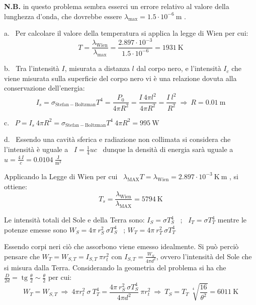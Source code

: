 \documentclass[12pt,twoside,a4]{article}
\DeclareMathOperator{\tg}{tg}
\begin{document}
\begin{solution}
	\textbf{N.B.} in questo problema sembra esserci un errore relativo al valore della lunghezza d'onda, che dovrebbe essere $\lambda_{\mathrm{max}} = 1.5 \cdot 10^{-6} \ \mathrm{m}$ .

\medskip
a. \ Per calcolare il valore della temperatura si applica la legge di Wien per cui: \begin{equation*}
 T = \frac{\lambda_{\mathrm{Wien}}}{\lambda_{\mathrm{max}}} = \frac{2.897 \cdot 10^{-3}}{1.5 \cdot 10^{-6}} = 1931 \ \mathrm{K}  
\end{equation*}

\bigskip
b. \ Tra l'intensità $I$, misurata a distanza $l$ dal corpo nero,  e l'intensità $I_c$ che viene misurata sulla superficie del corpo nero vi è una relazione dovuta alla conservazione dell'energia:  \begin{equation*}
 I_s = \sigma_{\mathrm{Stefan-Boltzman} } T^4 = \frac{P_0}{ 4\pi R^2} = \frac{I \ 4\pi l^2}{4 \pi R^2} = \frac{I \ l^2}{R^2}  \  \Rightarrow  \  R = 0.01 \ \mathrm{m}  
\end{equation*}

\bigskip
c. \ $P = I_s \ 4\pi R^2 = \sigma_{\mathrm{Stefan-Boltzman} } T^4 \ 4\pi R^2 = 995 \ \mathrm{W}$

\bigskip
d. \ Essendo una cavità sferica e radiazione non collimata si considera che l'intensità è uguale a \ $I = \frac{1}{4} u c $ \ dunque la densità di energia sarà uguale a \ $u = \frac{4 \ I}{c} = 0.0104 \ \frac{\mathrm{J}}{\mathrm{m}^2} $ 
\end{solution}

\newpage
\begin{solution}
	Applicando la Legge di Wien per cui  \ $\lambda_\mathrm{MAX}  T = \lambda_{\mathrm{Wien}} = 2.897 \cdot 10^{-3} \ {\mathrm{K \ m}}$ ,  si ottiene: 
 \begin{equation*}
     T_s = \frac{\lambda_{\mathrm{Wien}}}{\lambda_{\mathrm{MAX}}} = 5794 \ \mathrm{K} 
 \end{equation*}
\end{solution}


\begin{solution}
	Le intensità totali del Sole e della Terra sono: $I_S = \sigma  T^4_S$ \ ; \ $I_T = \sigma  T^4_T$ 
  mentre le potenze emesse sono $W_S = 4\pi \ r^2_S \ \sigma T^4_S$ \ ;  $W_T = 4\pi \ r^2_T \ \sigma T^4_T$ 
 
 \medskip
 Essendo corpi neri ciò che assorbono viene emesso idealmente. Si può perciò pensare che ${W}_T = {W}_{S,T} = I_{S,T} \ \pi r^2_t$ con $I_{S,T} = \frac{W_S}{4\pi d^2}$, ovvero l'intensità del Sole che si misura dalla Terra. 
 Considerando la geometria del problema si ha che $\frac{D}{2d} = \tg{\frac{\theta}{2}} \sim \frac{\theta}{2}$ per cui: 
 \begin{equation*}
     W_T = W_{S,T}  \  \Rightarrow  \  4\pi r^2_t \ \sigma \ T^4_T = \frac{4\pi \ r^2_S \ \sigma T^4_S}{4\pi d^2} \ \pi r^2_t   \  \Rightarrow  \  T_S = T_T \ \sqrt[4]{\frac{16}{{\theta}^2}}  = 6011 \ \mathrm{K} 
 \end{equation*}
\end{solution}
\end{document}
